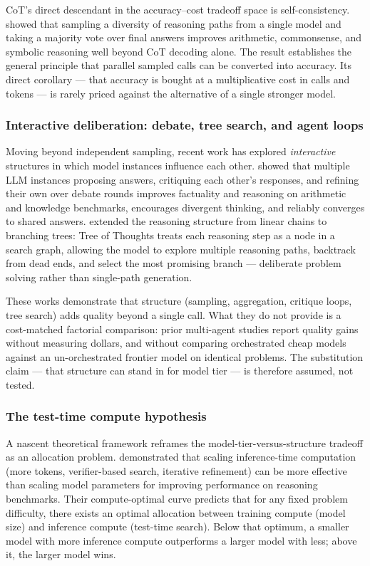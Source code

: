 \documentclass[12pt,a4paper]{article}
\begin{document}
CoT's direct descendant in the accuracy--cost tradeoff space is
self-consistency. \citet{WangEtAl2023} showed that sampling a diversity of
reasoning paths from a single model and taking a majority vote over final
answers improves arithmetic, commonsense, and symbolic reasoning well beyond
CoT decoding alone. The result establishes the general principle that parallel
sampled calls can be converted into accuracy. Its direct corollary --- that
accuracy is bought at a multiplicative cost in calls and tokens --- is rarely
priced against the alternative of a single stronger model.

\subsubsection{Interactive deliberation: debate, tree search, and agent loops}

Moving beyond independent sampling, recent work has explored \emph{interactive}
structures in which model instances influence each other. \citet{LiangEtAl2024}
showed that multiple LLM instances proposing answers, critiquing each other's
responses, and refining their own over debate rounds improves factuality and
reasoning on arithmetic and knowledge benchmarks, encourages divergent
thinking, and reliably converges to shared answers. \citet{YaoEtAl2023} extended
the reasoning structure from linear chains to branching trees: Tree of Thoughts
treats each reasoning step as a node in a search graph, allowing the model to
explore multiple reasoning paths, backtrack from dead ends, and select the most
promising branch --- deliberate problem solving rather than single-path
generation.

These works demonstrate that structure (sampling, aggregation, critique loops,
tree search) adds quality beyond a single call. What they do not provide is a
cost-matched factorial comparison: prior multi-agent studies report quality
gains without measuring dollars, and without comparing orchestrated cheap models
against an un-orchestrated frontier model on identical problems. The
substitution claim --- that structure can stand in for model tier --- is
therefore assumed, not tested.

\subsubsection{The test-time compute hypothesis}

A nascent theoretical framework reframes the model-tier-versus-structure
tradeoff as an allocation problem. \citet{SnellEtAl2024} demonstrated that
scaling inference-time computation (more tokens, verifier-based search,
iterative refinement) can be more effective than scaling model parameters for
improving performance on reasoning benchmarks. Their compute-optimal curve
predicts that for any fixed problem difficulty, there exists an optimal
allocation between training compute (model size) and inference compute
(test-time search). Below that optimum, a smaller model with more inference
compute outperforms a larger model with less; above it, the larger model wins.
\end{document}
